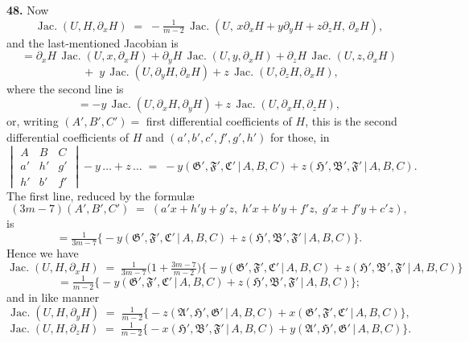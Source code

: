 \documentclass[11pt,a4paper]{article}
\providecommand{\mid}{\,|\,}
\providecommand{\Jac}{\operatorname{Jac.}}
\begin{document}
\medskip

\textbf{48.} Now
\[
\Jac(U,H,\partial_x H) \;=\; -\tfrac{1}{m-2}\,\Jac(U,\,x\partial_x H + y\partial_y H + z\partial_z H,\,\partial_x H),
\]
and the last-mentioned Jacobian is
\[
= \partial_x H\,\Jac(U,x,\partial_x H) + \partial_y H\,\Jac(U,y,\partial_x H) + \partial_z H\,\Jac(U,z,\partial_x H)
\]
\[
\;+\; y\,\Jac(U,\partial_y H,\partial_x H) + z\,\Jac(U,\partial_z H,\partial_x H),
\]
where the second line is
\[
= -y\,\Jac(U,\partial_x H,\partial_y H) + z\,\Jac(U,\partial_x H,\partial_z H),
\]
or, writing $(A',B',C') = $ first differential coefficients of $H$, this is the second differential coefficients of $H$ and $(a',b',c',f',g',h')$ for those, in
\[
\begin{vmatrix} A & B & C \\ a' & h' & g' \\ h' & b' & f' \end{vmatrix} - y\,\ldots + z\,\ldots \;=\; -y(\mathfrak{G}',\mathfrak{F}',\mathfrak{C}'\mid A,B,C) + z(\mathfrak{H}',\mathfrak{B}',\mathfrak{F}'\mid A,B,C).
\]
The first line, reduced by the formul{\ae}
\[
(3m-7)(A',B',C') \;=\; (a'x + h'y + g'z,\; h'x + b'y + f'z,\; g'x + f'y + c'z),
\]
is
\[
= \tfrac{1}{3m-7}\bigl\{-y(\mathfrak{G}',\mathfrak{F}',\mathfrak{C}'\mid A,B,C) + z(\mathfrak{H}',\mathfrak{B}',\mathfrak{F}'\mid A,B,C)\bigr\}.
\]
Hence we have
\[
\Jac(U,H,\partial_x H) \;=\; \tfrac{1}{3m-7}\bigl(1 + \tfrac{3m-7}{m-2}\bigr)\bigl\{-y(\mathfrak{G}',\mathfrak{F}',\mathfrak{C}'\mid A,B,C) + z(\mathfrak{H}',\mathfrak{B}',\mathfrak{F}'\mid A,B,C)\bigr\}
\]
\[
= \tfrac{1}{m-2}\bigl\{-y(\mathfrak{G}',\mathfrak{F}',\mathfrak{C}'\mid A,B,C) + z(\mathfrak{H}',\mathfrak{B}',\mathfrak{F}'\mid A,B,C)\bigr\};
\]
and in like manner
\[
\Jac(U,H,\partial_y H) \;=\; \tfrac{1}{m-2}\bigl\{-z(\mathfrak{A}',\mathfrak{H}',\mathfrak{G}'\mid A,B,C) + x(\mathfrak{G}',\mathfrak{F}',\mathfrak{C}'\mid A,B,C)\bigr\},
\]
\[
\Jac(U,H,\partial_z H) \;=\; \tfrac{1}{m-2}\bigl\{-x(\mathfrak{H}',\mathfrak{B}',\mathfrak{F}'\mid A,B,C) + y(\mathfrak{A}',\mathfrak{H}',\mathfrak{G}'\mid A,B,C)\bigr\}.
\]

\medskip
\end{document}
